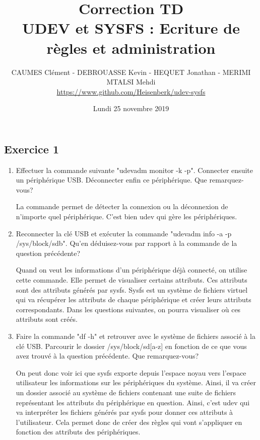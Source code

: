 \documentclass[11pt]{article}
\title{\huge{\textbf {Correction TD} \\UDEV et SYSFS : Ecriture de règles et administration}}
\date{Lundi 25 novembre 2019}
\author{CAUMES Clément - DEBROUASSE Kevin - HEQUET Jonathan - MERIMI MTALSI Mehdi \\ \url{https://www.github.com/Heisenberk/udev-sysfs}}
\begin{document}
\maketitle

\subsection*{Exercice 1}

\begin{enumerate}
	\item Effectuer la commande suivante "udevadm monitor -k -p". Connecter ensuite un périphérique USB. Déconnecter enfin ce périphérique. Que remarquez-vous? 
	
	 \bigskip 
	
	La commande permet de détecter la connexion ou la déconnexion de n'importe quel périphérique. C'est bien udev qui gère les périphériques.\bigskip
	
	\item Reconnecter la clé USB et exécuter la commande "udevadm info -a -p /sys/block/sdb". Qu'en déduisez-vous par rapport à la commande de la question précédente? 
	
	 \bigskip
	
	Quand on veut les informations d'un périphérique déjà connecté, on utilise cette commande. Elle permet de visualiser certains attributs. 
	Ces attributs sont des attributs générés par sysfs. Sysfs est un système de fichiers virtuel qui va récupérer les attributs de chaque périphérique et créer leurs 
	attributs correspondants. Dans les questions suivantes, on pourra visualiser où ces attributs sont créés.
	
	\item Faire la commande "df -h" et retrouver avec le système de fichiers associé à la clé USB. 
	Parcourir le dossier /sys/block/sd[a-z] en fonction de ce que vous avez trouvé à la question précédente. Que remarquez-vous?
	
	 \bigskip
	
	 \bigskip
	
	On peut donc voir ici que sysfs exporte depuis l'espace noyau vers l'espace utilisateur les informations 
	sur les périphériques du système. Ainsi, il va créer un dossier associé au système de fichiers contenant une 
	suite de fichiers représentant les attributs du périphérique en question. Ainsi, c'est udev qui va 
	interpréter les fichiers générés par sysfs pour donner ces attributs à l'utilisateur. Cela permet donc 
	de créer des règles qui vont s'appliquer en fonction des attributs des périphériques. \newpage
	

\end{enumerate}
\end{document}
